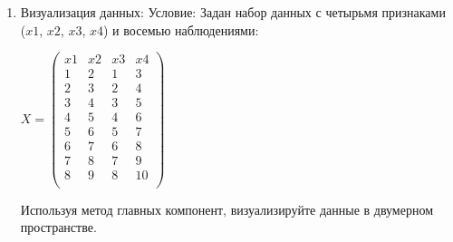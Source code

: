 \begin{enumerate}
    \item 
        Визуализация данных:
        Условие: Задан набор данных с четырьмя признаками \\
        ($x1$, $x2$, $x3$, $x4$) и восемью наблюдениями:
        \begin{center}
         $X = 
             \begin{pmatrix}
              x1 &  x2 &  x3 & x4\\
              1 &  2 &  1 & 3\\
              2 &  3 &  2 & 4\\
              3 &  4 &  3 & 5\\
              4 &  5 &  4 & 6\\
              5 &  6 &  5 & 7\\
              6 &  7 &  6 & 8\\
              7 &  8 &  7 & 9\\
              8 &  9 &  8 & 10\\
             \end{pmatrix}$\par
        \end{center}
        Используя метод главных компонент, визуализируйте данные в двумерном пространстве.
\end{enumerate}

